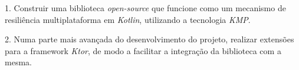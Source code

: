 1.
Construir uma biblioteca \textit{open-source} que funcione como um mecanismo de resiliência multiplataforma em \textit{Kotlin}, utilizando a tecnologia \textit{KMP}.

2.
Numa parte mais avançada do desenvolvimento do projeto, realizar extensões para a framework \textit{Ktor}, de modo a facilitar a integração da biblioteca com a mesma.
